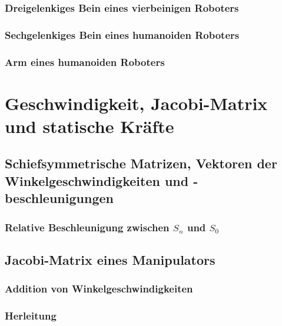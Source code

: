 \documentclass[a4paper, 11pt, accentcolor = tud3b]{tudreport}
\begin{document}
			\subsection{Dreigelenkiges Bein eines vierbeinigen Roboters} %

			\subsection{Sechgelenkiges Bein eines humanoiden Roboters} %

			\subsection{Arm eines humanoiden Roboters} %

	\chapter{Geschwindigkeit, Jacobi-Matrix und statische Kräfte} %

		\section{Schiefsymmetrische Matrizen, Vektoren der Winkelgeschwindigkeiten und -beschleunigungen} %

			\subsection{Relative Beschleunigung zwischen \(S_n\) und \(S_0\)} %

		\section{Jacobi-Matrix eines Manipulators} %

			\subsection{Addition von Winkelgeschwindigkeiten} %

			\subsection{Herleitung} %
\end{document}
